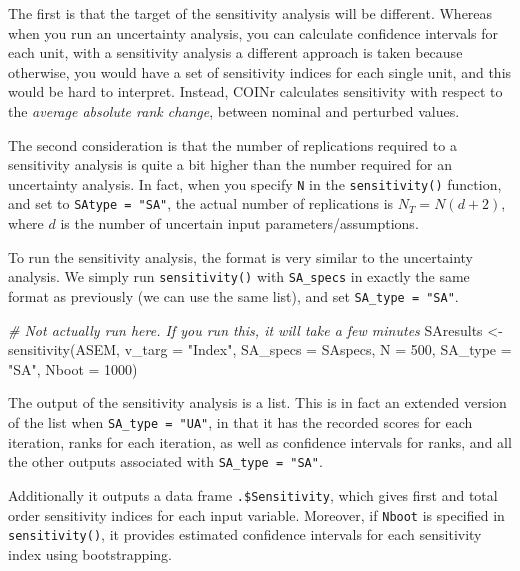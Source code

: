 \documentclass[
]{book}
\newenvironment{Shaded}{\begin{snugshade}}{\end{snugshade}}
\newcommand{\AttributeTok}[1]{\textcolor[rgb]{0.77,0.63,0.00}{#1}}
\newcommand{\CommentTok}[1]{\textcolor[rgb]{0.56,0.35,0.01}{\textit{#1}}}
\newcommand{\DecValTok}[1]{\textcolor[rgb]{0.00,0.00,0.81}{#1}}
\newcommand{\FunctionTok}[1]{\textcolor[rgb]{0.00,0.00,0.00}{#1}}
\newcommand{\NormalTok}[1]{#1}
\newcommand{\OtherTok}[1]{\textcolor[rgb]{0.56,0.35,0.01}{#1}}
\newcommand{\StringTok}[1]{\textcolor[rgb]{0.31,0.60,0.02}{#1}}
\begin{document}
The first is that the target of the sensitivity analysis will be different. Whereas when you run an uncertainty analysis, you can calculate confidence intervals for each unit, with a sensitivity analysis a different approach is taken because otherwise, you would have a set of sensitivity indices for each single unit, and this would be hard to interpret. Instead, COINr calculates sensitivity with respect to the \emph{average absolute rank change}, between nominal and perturbed values.

The second consideration is that the number of replications required to a sensitivity analysis is quite a bit higher than the number required for an uncertainty analysis. In fact, when you specify \texttt{N} in the \texttt{sensitivity()} function, and set to \texttt{SAtype\ =\ "SA"}, the actual number of replications is \(N_T = N(d +2)\), where \(d\) is the number of uncertain input parameters/assumptions.

To run the sensitivity analysis, the format is very similar to the uncertainty analysis. We simply run \texttt{sensitivity()} with \texttt{SA\_specs} in exactly the same format as previously (we can use the same list), and set \texttt{SA\_type\ =\ "SA"}.

\begin{Shaded}
\begin{Highlighting}[]
\CommentTok{\# Not actually run here. If you run this, it will take a few minutes}
\NormalTok{SAresults }\OtherTok{\textless{}{-}} \FunctionTok{sensitivity}\NormalTok{(ASEM, }\AttributeTok{v\_targ =} \StringTok{"Index"}\NormalTok{,}
                         \AttributeTok{SA\_specs =}\NormalTok{ SAspecs,}
                         \AttributeTok{N =} \DecValTok{500}\NormalTok{,}
                         \AttributeTok{SA\_type =} \StringTok{"SA"}\NormalTok{, }\AttributeTok{Nboot =} \DecValTok{1000}\NormalTok{)}
\end{Highlighting}
\end{Shaded}

The output of the sensitivity analysis is a list. This is in fact an extended version of the list when \texttt{SA\_type\ =\ "UA"}, in that it has the recorded scores for each iteration, ranks for each iteration, as well as confidence intervals for ranks, and all the other outputs associated with \texttt{SA\_type\ =\ "SA"}.

Additionally it outputs a data frame \texttt{.\$Sensitivity}, which gives first and total order sensitivity indices for each input variable. Moreover, if \texttt{Nboot} is specified in \texttt{sensitivity()}, it provides estimated confidence intervals for each sensitivity index using bootstrapping.
\end{document}
